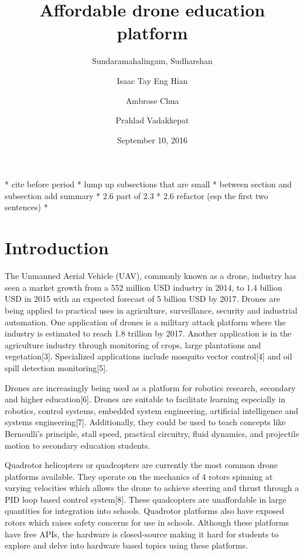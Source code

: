 \documentclass[12pt]{article}
\title{Affordable drone education platform}
\date{September 10, 2016}
\author{
	Sundaramahalingam, Sudharshan\\
	\and
	Isaac Tay Eng Hian\\
	\and
	Ambrose Chua\\
	\and
	Prahlad Vadakkepat
}
\begin{document}
\maketitle
{}
\newpage
{}

* cite before period
* lump up subsections that are small
* between section and subsection add summary
* 2.6 part of 2.3
* 2.6 refactor (esp the first two sentences)
* 

\section{Introduction}

The Unmanned Aerial Vehicle (UAV), commonly known as a drone, industry has seen a market growth from a 552 million USD industry in 2014, to 1.4 billion USD in 2015 with an expected forecast of 5 billion USD by 2017\cite{legalandsocial}. Drones are being applied to practical uses in agriculture, surveillance, security and industrial automation. One application of drones is a military attack platform where the industry is estimated to reach 1.8 trillion by 2017\cite{dronewars}. Another application is in the agriculture industry through monitoring of crops, large plantations and vegetation[3]. Specialized applications include mosquito vector control[4] and oil spill detection monitoring[5]. 

Drones are increasingly being used as a platform for robotics research, secondary and higher education[6]. Drones are suitable to facilitate learning especially in robotics, control systems, embedded system engineering, artificial intelligence and systems engineering[7]. Additionally, they could be used to teach concepts like Bernoulli’s principle, stall speed, practical circuitry, fluid dynamics, and projectile motion to secondary education students.

Quadrotor helicopters or quadcopters are currently the most common drone platforms available. They operate on the mechanics of 4 rotors spinning at varying velocities which allows the drone to achieve steering and thrust through a PID loop based control system[8]. These quadcopters are unaffordable in large quantities for integration into schools. Quadrotor platforms also have exposed rotors which raises safety concerns for use in schools. Although these platforms have free APIs, the hardware is closed-source making it hard for students to explore and delve into hardware based topics using these platforms.
\end{document}
